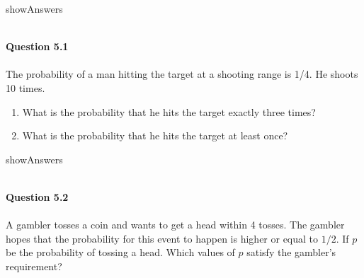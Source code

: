 \documentclass{article}
\begin{document}
\begin{maybePrint}{showAnswers}
~\\~\\
\end{maybePrint}
%
%
{\bf Question 5.1}
~\\~\\
The probability of a man hitting the target at a shooting range is 1/4. He shoots 10 times. 
\begin{enumerate}
\item[(a)]  What is the probability that he hits the target exactly three times?
\item[(b)]  What is the probability that he hits the target at least once?
\end{enumerate}
\begin{maybePrint}{showAnswers}
~\\~\\
\end{maybePrint}
%
%
{\bf Question 5.2}
~\\~\\
A gambler tosses a coin and wants to get a head within 4 tosses. The gambler hopes that the probability for this event to happen is higher or equal to $1/2$. If $p$ be the probability of tossing a head. Which values of $p$ satisfy the gambler's requirement?
\end{document}
